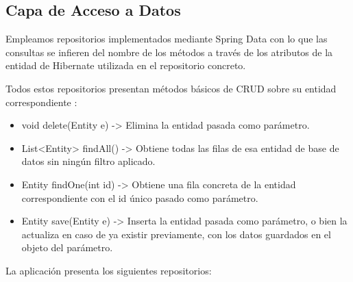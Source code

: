\documentclass[12pt, a4paper, twoside]{book}
\let\<\textless
\let\>\textgreater
\begin{document}
	\subsection{Capa de Acceso a Datos}
	
	Empleamos repositorios implementados mediante Spring Data con lo que las consultas se infieren del nombre de los métodos a través de los atributos de la entidad de Hibernate utilizada en el repositorio concreto.
	
	Todos estos repositorios presentan métodos básicos de CRUD sobre su entidad correspondiente : 
	\begin{itemize}
		\item void delete(Entity e) -\> Elimina la entidad pasada como parámetro.
		\item List\<Entity\> findAll() -\> Obtiene todas las filas de esa entidad de base de datos sin ningún filtro aplicado.
		\item Entity findOne(int id) -\> Obtiene una fila concreta de la entidad correspondiente con el id único pasado como parámetro.
		\item Entity save(Entity e) -\> Inserta la entidad pasada como parámetro, o bien la actualiza en caso de ya existir previamente, con los datos guardados en el objeto del parámetro.
	\end{itemize}
	
	La aplicación presenta los siguientes repositorios:
	
\end{document}
